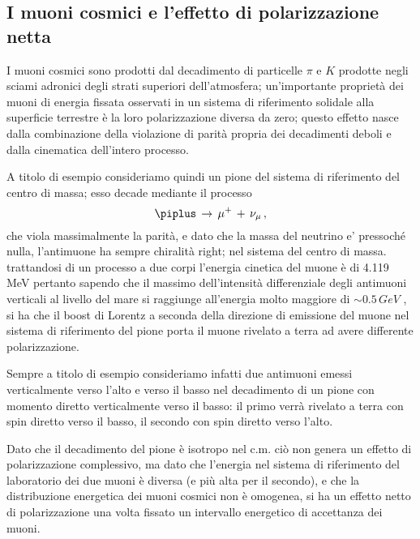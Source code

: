 \subsection{I muoni cosmici e l'effetto di polarizzazione netta}
I muoni cosmici sono prodotti dal decadimento di particelle $\pi$ e $K$ prodotte negli sciami adronici degli strati superiori dell'atmosfera; un'importante proprietà dei muoni di energia fissata osservati in un sistema di riferimento solidale alla superficie terrestre è la loro polarizzazione diversa da zero; questo effetto nasce dalla combinazione della violazione di parità propria dei decadimenti deboli e dalla cinematica dell'intero processo. \par
A titolo di esempio consideriamo quindi un pione del sistema di riferimento del centro di massa; esso decade mediante il processo
\begin{equation}
	\piplus \, \to \, \mu^+ \, + \, \nu_{\mu} \, ,
	\label{eq:pi_decay}
\end{equation}
che viola massimalmente la parità, e dato che la massa del neutrino e' pressoch\'e nulla, l'antimuone ha sempre chiralità right; nel sistema del centro di massa. trattandosi di un processo a due corpi l'energia cinetica del muone è di 4.119 MeV  pertanto sapendo che il massimo dell'intensità differenziale degli antimuoni verticali al livello del mare si raggiunge all'energia molto maggiore di $\sim 0.5 \, GeV$  \cite{bib:AJP-Amsler}, si ha che il boost di Lorentz a seconda della direzione di emissione del muone nel sistema di riferimento del pione porta il muone rivelato a terra ad avere differente polarizzazione. \par
Sempre a titolo di esempio consideriamo infatti due antimuoni emessi verticalmente verso l'alto e verso il basso nel decadimento di un pione con momento diretto verticalmente verso il basso:
il primo verrà rivelato a terra con spin diretto verso il basso, il secondo con spin diretto verso l'alto. \par
Dato che il decadimento del pione è isotropo nel c.m. ciò non genera un effetto di polarizzazione complessivo, ma dato che l'energia nel sistema di riferimento del laboratorio dei due muoni è diversa (e più alta per il secondo), e che la distribuzione energetica dei muoni cosmici non è omogenea, si ha un effetto netto di polarizzazione una volta fissato un intervallo energetico di accettanza dei muoni. \cite{bib:Lipari:1993hd} \par

 \par


